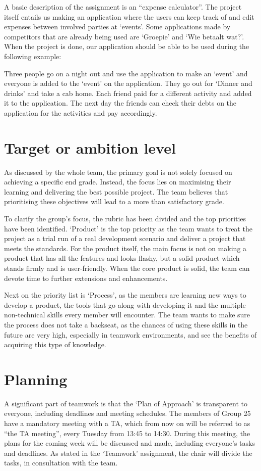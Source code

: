 \documentclass[sigconf,nonacm]{acmart}
\begin{document}
A basic description of the assignment is an “expense calculator”. The project itself entails us making an application where the users can keep track of and edit expenses between involved parties at ‘events’. Some applications made by competitors that are already being used are ‘Groepie’ and ‘Wie betaalt wat?’. When the project is done, our application should be able to be used during the following example:

Three people go on a night out and use the application to make an ‘event’ and everyone is added to the ‘event’ on the application. They go out for ‘Dinner and drinks’ and take a cab home. Each friend paid for a different activity and added it to the application. The next day the friends can check their debts on the application for the activities and pay accordingly.


\section{Target or ambition level}
As discussed by the whole team, the primary goal is not solely focused on achieving a specific end grade. Instead, the focus lies on maximising their learning and delivering the best possible project. The team believes that prioritising these objectives will lead to a more than satisfactory grade.

To clarify the group’s focus, the rubric has been divided and the top priorities have been identified. ‘Product’ is the top priority as the team wants to treat the project as a trial run of a real development scenario and deliver a project that meets the standards. For the product itself, the main focus is not on making a product that has all the features and looks flashy, but a solid product which stands firmly and is user-friendly.
When the core product is solid, the team can devote time to further extensions and enhancements.

Next on the priority list is ‘Process’, as the members are learning new ways to develop a product, the tools that go along with developing it and the multiple non-technical skills every member will encounter. The team wants to make sure the process does not take a backseat, as the chances of using these skills in the future are very high, especially in teamwork environments, and see the benefits of acquiring this type of knowledge.


\section{Planning}
A significant part of teamwork is that the ‘Plan of Approach’ is transparent to everyone, including deadlines and meeting schedules. The members of Group 25 have a mandatory meeting with a TA, which from now on will be referred to as “the TA meeting”, every Tuesday from 13:45 to 14:30. During this meeting, the plans for the coming week will be discussed and made, including everyone’s tasks and deadlines. As stated in the ‘Teamwork’ assignment, the chair will divide the tasks, in consultation with the team.
\end{document}
